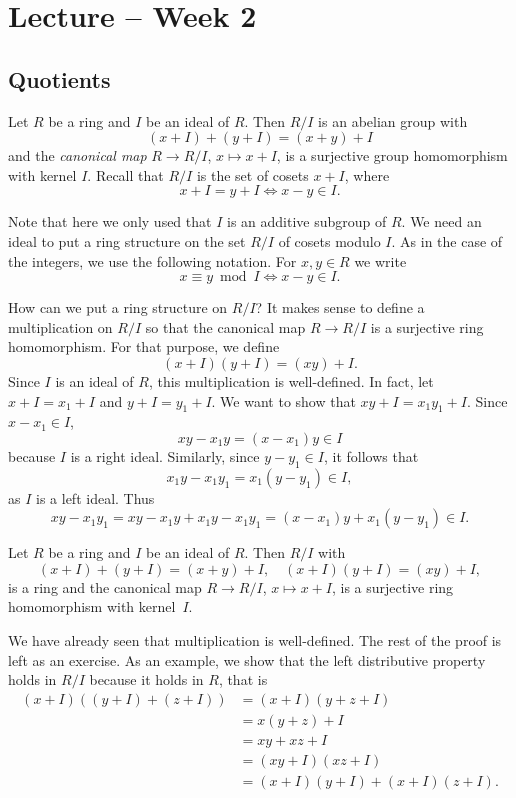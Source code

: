 \section{Lecture -- Week 2}

\subsection{Quotients}

Let $R$ be a ring and $I$ be an ideal of $R$. 
Then $R/I$ is an abelian group
with 
\[
(x+I)+(y+I)=(x+y)+I
\]
and the 
\emph{canonical map} 
$R\to R/I$, $x\mapsto x+I$,
is a surjective group homomorphism with kernel $I$. Recall that 
$R/I$ is the set of cosets $x+I$, where 
\[
x+I=y+I\Longleftrightarrow x-y\in I.
\]

Note that here we only used
that $I$ is an additive subgroup of $R$. We need an ideal to put a ring structure
on the set $R/I$ of cosets modulo $I$. As in the case of the integers, 
we use the following notation. For $x,y\in R$ 
we write 
\[
x\equiv y\bmod I\Longleftrightarrow x-y\in I.
\]

How can we put a ring structure on $R/I$? It makes sense
to define a multiplication on $R/I$ so that
the canonical map $R\to R/I$ is a surjective ring homomorphism. For that purpose, 
we define 
\[
(x+I)(y+I)=(xy)+I.
\]
Since $I$ is an ideal of $R$, this multiplication is well-defined. In fact, let 
$x+I=x_1+I$ and $y+I=y_1+I$. We want to show that
$xy+I=x_1y_1+I$. Since $x-x_1\in I$, 
\[
xy-x_1y=(x-x_1)y\in I
\]
because $I$ is a right ideal. Similarly, since $y-y_1\in I$, it follows that 
\[
x_1y-x_1y_1=x_1(y-y_1)\in I,
\]
as $I$ is a left ideal. Thus
\[
xy-x_1y_1=xy-x_1y+x_1y-x_1y_1=(x-x_1)y+x_1(y-y_1)\in I.
\]

\begin{theorem}
\label{thm:quotient_ring}
	Let $R$ be a ring and $I$ be an ideal of $R$. Then
	$R/I$ with 
	\[
	(x+I)+(y+I)=(x+y)+I,\quad
	(x+I)(y+I)=(xy)+I,
	\]
	is a ring and the canonical map $R\to R/I$, $x\mapsto x+I$, 
	is a surjective ring homomorphism with kernel~$I$. 
\end{theorem}

We have already seen that multiplication is well-defined. 
The rest of the proof is left as an exercise. As an example, we show that 
the left distributive property holds
in $R/I$ because it holds in $R$, that is 
\begin{align*}
    (x+I)\left((y+I)+(z+I)\right) &= (x+I)(y+z+I)\\
    &=x(y+z)+I\\
    &=xy+xz+I\\
    &=(xy+I)(xz+I)\\
    &=(x+I)(y+I)+(x+I)(z+I).
\end{align*}

